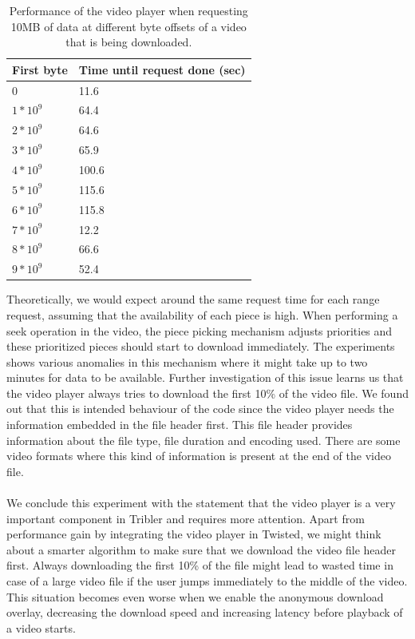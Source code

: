 \begin{table}[]
	\centering
	\begin{tabular}{|l|l|}
		\hline
		\textbf{First byte}               & \textbf{Time until request done (sec)} \\ \hline
		0                        & 11.6                  \\ \hline
		$ 1 * 10^9 $ & 64.4                  \\ \hline
		$ 2 * 10^9 $ & 64.6                  \\ \hline
		$ 3 * 10^9 $ & 65.9                   \\ \hline
		$ 4 * 10^9 $ & 100.6                   \\ \hline
		$ 5 * 10^9 $ & 115.6                   \\ \hline
		$ 6 * 10^9 $ & 115.8                  \\ \hline
		$ 7 * 10^9 $ & 12.2                  \\ \hline
		$ 8 * 10^9 $ & 66.6                   \\ \hline
		$ 9 * 10^9 $ & 52.4                   \\ \hline
	\end{tabular}
	\caption{Performance of the video player when requesting 10MB of data at different byte offsets of a video that is being downloaded.}
	\label{table:video_player_seek_times}
\end{table}

Theoretically, we would expect around the same request time for each range request, assuming that the availability of each piece is high. When performing a seek operation in the video, the piece picking mechanism adjusts priorities and these prioritized pieces should start to download immediately. The experiments shows various anomalies in this mechanism where it might take up to two minutes for data to be available. Further investigation of this issue learns us that the video player always tries to download the first 10\% of the video file. We found out that this is intended behaviour of the code since the video player needs the information embedded in the file header first. This file header provides information about the file type, file duration and encoding used. There are some video formats where this kind of information is present at the end of the video file.\\\\
We conclude this experiment with the statement that the video player is a very important component in Tribler and requires more attention. Apart from performance gain by integrating the video player in Twisted, we might think about a smarter algorithm to make sure that we download the video file header first. Always downloading the first 10\% of the file might lead to wasted time in case of a large video file if the user jumps immediately to the middle of the video. This situation becomes even worse when we enable the anonymous download overlay, decreasing the download speed and increasing latency before playback of a video starts.

